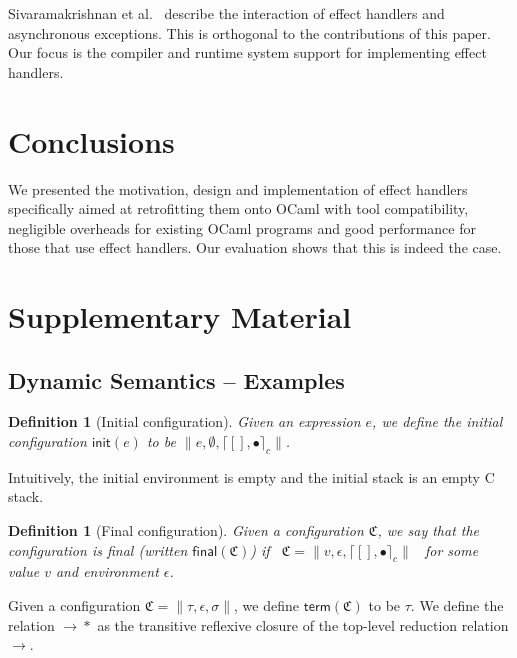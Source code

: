 \documentclass[sigplan,10pt,review,anonymous]{acmart}\settopmatter{printfolios=true,printccs=false,printacmref=false}
\newtheorem{definition}[theorem]{Definition}
\newcommand{\env}{\epsilon}
\newcommand{\cstacka}[2]{\big \lceil #1, #2 \big \rceil_c} %
\newcommand{\stack}{\sigma}
\newcommand{\term}{\tau}
\newcommand{\config}{\mathfrak{C}}
\newcommand{\configa}[3]{\|#1,#2,#3\|}
\newcommand{\step}{\rightarrow}
\newcommand{\multistep}{\rightarrow\!\!*}
\begin{document}
Sivaramakrishnan et al.~\cite{TFP17} describe the interaction of effect
handlers and asynchronous exceptions. This is orthogonal to the contributions
of this paper. Our focus is the compiler and runtime system support for
implementing effect handlers.

\section{Conclusions}
\label{sec:conc}

We presented the motivation, design and implementation of effect handlers
specifically aimed at retrofitting them onto OCaml with tool compatibility,
negligible overheads for existing OCaml programs and good performance for those
that use effect handlers. Our evaluation shows that this is indeed the case.

\clearpage




\clearpage

\section*{Supplementary Material}
\setcounter{figure}{0}

\subsection*{Dynamic Semantics -- Examples}

\begin{definition}[Initial configuration]
	Given an expression $e$, we define the initial configuration $\textsf{init}(e)$
	to be $\configa{e}{\emptyset}{\cstacka{[]}{\bullet}}$.
\end{definition}

Intuitively, the initial environment is empty and the initial stack is an empty
C stack.

\begin{definition}[Final configuration]
	Given a configuration $\config$, we say that the configuration is final
	(written $\textsf{final}(\config)$) if ~$\config =
	\configa{v}{\env}{\cstacka{[]}{\bullet}}$~ for some value $v$ and environment
	$\env$.
\end{definition}

Given a configuration $\config = \configa{\term}{\env}{\stack}$, we define
$\textsf{term}(\config)$ to be $\tau$. We define the relation $\multistep$ as
the transitive reflexive closure of the top-level reduction relation $\step$.
\end{document}
